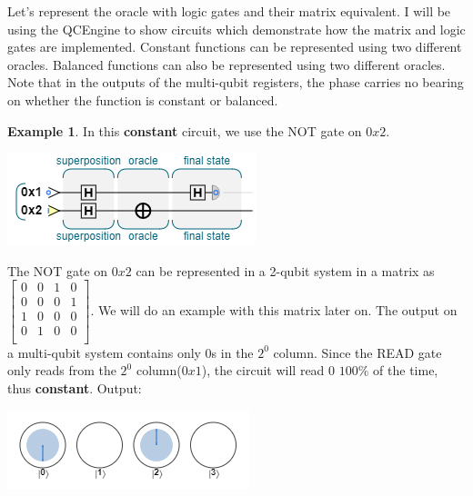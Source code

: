 \documentclass[12pt]{article}
\theoremstyle{definition}
\newtheorem{example}[theorem]{Example}
\begin{document}
\noindent Let's represent the oracle with logic gates and their matrix equivalent. I will be using the QCEngine to show circuits which demonstrate how the matrix and logic gates are implemented. Constant functions can be represented using two different oracles. Balanced functions can also be represented using two different oracles. Note that in the outputs of the multi-qubit registers, the phase carries no bearing on whether the function is constant or balanced. 
\begin{example}
In this \textbf{constant} circuit, we use the NOT gate on $0x2$.
\begin{center}
    \includegraphics[]{cona1.PNG}
\end{center}



\noindent The NOT gate on $0x2$ can be represented in a 2-qubit system in a matrix as $\begin{bmatrix}
0&0&1&0\\
0&0&0&1\\
1&0&0&0\\
0&1&0&0\\
\end{bmatrix}$. We will do an example with this matrix later on.
The output on a multi-qubit system contains only 0s in the $2^0$ column. Since the READ gate only reads from the $2^0$ column($0x1$), the circuit will read $0$ $100\%$ of the time, thus \textbf{constant}. Output:

\vspace{.2 cm}
\begin{center}
    \includegraphics[]{cona2.PNG}
\end{center}
\end{example}
\vspace{.5 cm}
\end{document}
